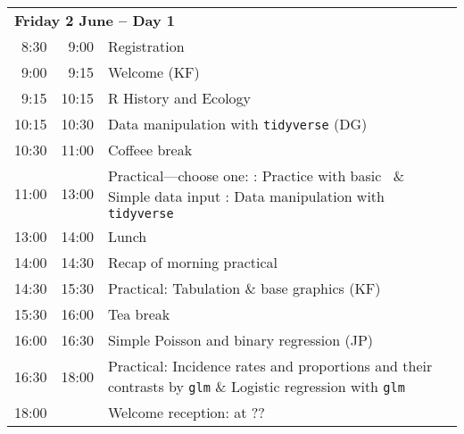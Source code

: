 \noindent
\begin{tabular}{r@{ -- }rp{13cm}}
\multicolumn{3}{l}{\bf Friday 2 June -- Day 1} \\
 8:30 &  9:00 & Registration \\
 9:00 &  9:15 & Welcome (KF) \\
 9:15 & 10:15 & R History and Ecology\\%
10:15 & 10:30 & Data manipulation with \texttt{tidyverse} (DG) \\
10:30 & 11:00 & Coffeee break \\
11:00 & 13:00 & Practical---choose one: \newline
                1: Practice with basic \R\ \& Simple data input \newline
                2: Data manipulation with \texttt{tidyverse} \\

  
13:00 & 14:00 & Lunch \\
14:00 & 14:30 & Recap of morning practical \\
14:30 & 15:30 & Practical: Tabulation \& base graphics (KF)\\ %
15:30 & 16:00 & Tea break\\
16:00 & 16:30 & Simple Poisson and binary regression (JP)\\ %
16:30 & 18:00 & Practical: Incidence rates and proportions and their contrasts by \texttt{glm} \& Logistic regression with \texttt{glm}\\ 
18:00 &       & Welcome reception: at ?? \\[1em]
\end{tabular}

